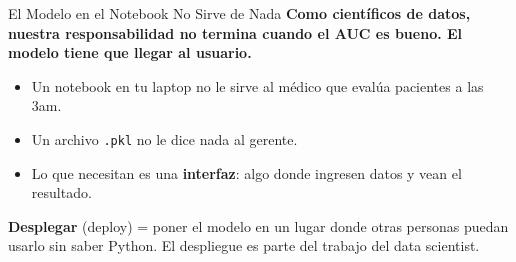 \documentclass[aspectratio=169, 11pt]{beamer}
\begin{document}
\begin{frame}{El Modelo en el Notebook No Sirve de Nada}
  \vspace{-4pt}
  {\footnotesize\color{arcaDark}\bfseries
    Como cient\'ificos de datos, nuestra responsabilidad \textbf{no termina}
    cuando el AUC es bueno. El modelo tiene que \textbf{llegar al usuario}.}

  \vspace{6pt}
  {\footnotesize
  \begin{itemize}\setlength{\itemsep}{5pt}
    \item[{\color{arcaRed}\scriptsize\faTimesCircle}]
      Un notebook en tu laptop no le sirve al m\'edico que eval\'ua
      pacientes a las 3am.
    \item[{\color{arcaRed}\scriptsize\faTimesCircle}]
      Un archivo \texttt{.pkl} no le dice nada al gerente.
    \item[{\color{codeGreen}\scriptsize\faCheckCircle}]
      Lo que necesitan es una \textbf{interfaz}: algo donde ingresen datos
      y vean el resultado.
  \end{itemize}
  }

  \vspace{6pt}
  \begin{tcolorbox}[colback=arcaGray, colframe=arcaRed, boxrule=0.5pt, arc=2pt,
    left=6pt, right=6pt, top=4pt, bottom=4pt]
    {\scriptsize\color{arcaDark}
    \faKey\hspace{4pt}\textbf{Desplegar} (deploy) = poner el modelo en un
    lugar donde otras personas puedan usarlo sin saber Python.
    El despliegue es parte del trabajo del data scientist.}
  \end{tcolorbox}
\end{frame}
\end{document}
